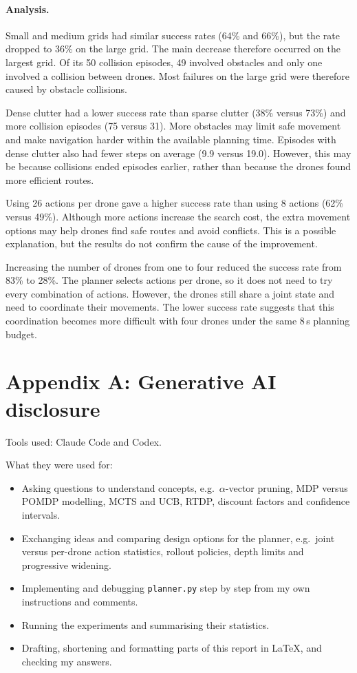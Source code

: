 \documentclass[11pt,a4paper]{article}
\begin{document}
\paragraph{Analysis.}
Small and medium grids had similar success rates (64\% and 66\%), but the rate dropped to 36\% on the large grid. The main decrease therefore occurred on the largest grid. Of its 50 collision episodes, 49 involved obstacles and only one involved a collision between drones. Most failures on the large grid were therefore caused by obstacle collisions.

Dense clutter had a lower success rate than sparse clutter (38\% versus 73\%) and more collision episodes (75 versus 31). More obstacles may limit safe movement and make navigation harder within the available planning time. Episodes with dense clutter also had fewer steps on average (9.9 versus 19.0). However, this may be because collisions ended episodes earlier, rather than because the drones found more efficient routes.

Using 26 actions per drone gave a higher success rate than using 8 actions (62\% versus 49\%). Although more actions increase the search cost, the extra movement options may help drones find safe routes and avoid conflicts. This is a possible explanation, but the results do not confirm the cause of the improvement.

Increasing the number of drones from one to four reduced the success rate from 83\% to 28\%. The planner selects actions per drone, so it does not need to try every combination of actions. However, the drones still share a joint state and need to coordinate their movements. The lower success rate suggests that this coordination becomes more difficult with four drones under the same 8\,s planning budget.

\appendix
\section*{Appendix A: Generative AI disclosure}
Tools used: Claude Code and Codex.

\noindent What they were used for:
\begin{itemize}[nosep]
  \item Asking questions to understand concepts, e.g.\ $\alpha$-vector pruning, MDP versus POMDP modelling, MCTS and UCB, RTDP, discount factors and confidence intervals.
  \item Exchanging ideas and comparing design options for the planner, e.g.\ joint versus per-drone action statistics, rollout policies, depth limits and progressive widening.
  \item Implementing and debugging \texttt{planner.py} step by step from my own instructions and comments.
  \item Running the experiments and summarising their statistics.
  \item Drafting, shortening and formatting parts of this report in \LaTeX, and checking my answers.
\end{itemize}
\end{document}
